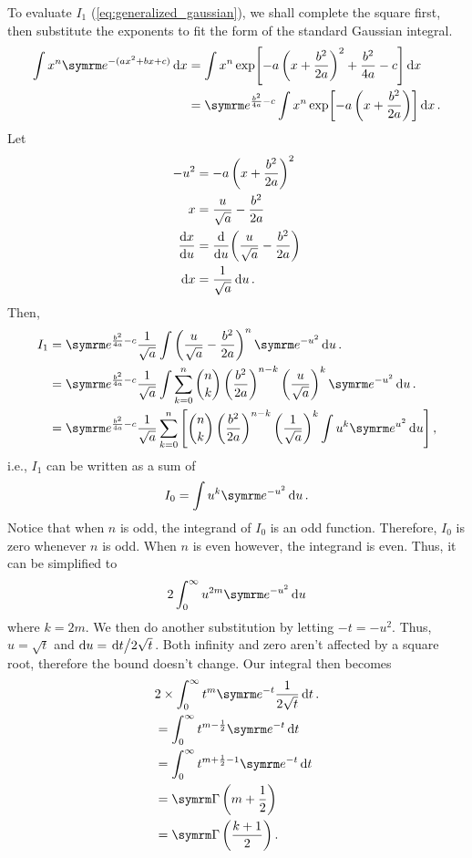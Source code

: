 To evaluate $I_1$ (\cref{eq:generalized_gaussian}), we shall complete the square first, then substitute the exponents to fit the form of the standard Gaussian integral.
\begin{align*}
    \int x^n\e^{-(ax^2 + bx + c)}\dd{x} &= \int x^n\exp[-a\left(x + \frac{b^2}{2a}\right)^2 + \frac{b^2}{4a} - c]\dd{x} \\
    &= \e^{\frac{b^2}{4a} - c}\int x^n\exp[-a\left(x + \frac{b^2}{2a}\right)]\dd{x}.
\end{align*}
Let
\begin{align}
    -u^2 &= -a\left(x + \frac{b^2}{2a}\right)^2 \\
    x &= \frac{u}{\sqrt{a}} - \frac{b^2}{2a} \\
    \dv{x}{u} &= \dv{u}(\frac{u}{\sqrt{a}} - \frac{b^2}{2a}) \\
    \dd{x} &= \frac{1}{\sqrt{a}}\dd{u}.
\end{align}
Then,
\begin{align}
    I_1 &= \e^{\frac{b^2}{4a} - c}\frac{1}{\sqrt{a}}\int\left(\frac{u}{\sqrt{a}} - \frac{b^2}{2a}\right)^n\e^{-u^2}\dd{u}. \\
    &= \e^{\frac{b^2}{4a} - c}\frac{1}{\sqrt{a}}\int\sum_{k = 0}^{n}{n \choose k}\left(\frac{b^2}{2a}\right)^{n - k}\left(\frac{u}{\sqrt{a}}\right)^k\e^{-u^2}\dd{u}. \\
    &= \e^{\frac{b^2}{4a} - c}\frac{1}{\sqrt{a}}\sum_{k = 0}^{n}\left[{n \choose k}\left(\frac{b^2}{2a}\right)^{n - k}\left(\frac{1}{\sqrt{a}}\right)^{k} \int u^k\e^{u^2}\dd{u}\right], \label{eq:generalized_gaussian-1}
\end{align}
i.e., $I_1$ can be written as a sum of
\begin{equation}
    I_0 = \int u^k\e^{-u^2}\dd{u}.
\end{equation}
Notice that when $n$ is odd, the integrand of $I_0$ is an odd function. Therefore, $I_0$ is zero whenever $n$ is odd. When $n$ is even however, the integrand is even. Thus, it can be simplified to
\begin{equation}
    2\int_{0}^{\infty} u^{2m}\e^{-u^2}\dd{u}
\end{equation}
where $k = 2m$. We then do another substitution by letting $-t = -u^2$. Thus, $u = \sqrt{t}$ and $\dd{u} = \flatfrac{\dd{t}}{2\sqrt{t}}$. Both infinity and zero aren't affected by a square root, therefore the bound doesn't change. Our integral then becomes
\begin{align}
    &2 \times \int_{0}^{\infty}t^{m}\e^{-t}\frac{1}{2\sqrt{t}}\dd{t}. \\
    &= \int_{0}^{\infty}t^{m - \frac{1}{2}}\e^{-t}\dd{t} \\
    &= \int_{0}^{\infty}t^{m + \frac{1}{2} - 1}\e^{-t}\dd{t} \\
    &= \fgamma\left(m + \frac{1}{2}\right) \\
    &= \fgamma\left(\frac{k + 1}{2}\right).
\end{align}
